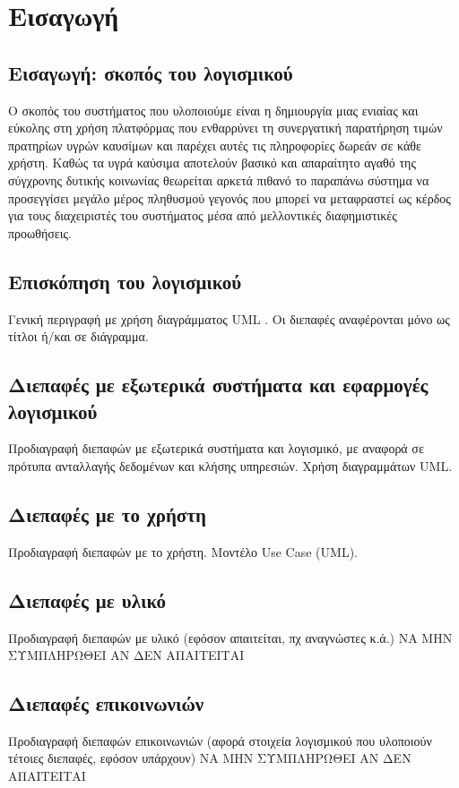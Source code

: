 \section{Εισαγωγή}

\subsection{Εισαγωγή: σκοπός του λογισμικού}
O σκοπός του συστήματος που υλοποιούμε είναι η δημιουργία μιας ενιαίας και εύκολης στη χρήση πλατφόρμας που ενθαρρύνει τη συνεργατική παρατήρηση τιμών πρατηρίων υγρών καυσίμων και παρέχει αυτές τις πληροφορίες δωρεάν σε κάθε χρήστη. Καθώς τα υγρά καύσιμα αποτελούν βασικό και απαραίτητο αγαθό της σύγχρονης δυτικής κοινωνίας θεωρείται αρκετά πιθανό το παραπάνω σύστημα να προσεγγίσει μεγάλο μέρος πληθυσμού γεγονός που μπορεί να μεταφραστεί ως κέρδος για τους διαχειριστές του συστήματος μέσα από μελλοντικές διαφημιστικές προωθήσεις.


\subsection{Επισκόπηση του λογισμικού}
Γενική περιγραφή με χρήση διαγράμματος UML . Οι διεπαφές αναφέρονται μόνο ως τίτλοι ή/και σε
διάγραμμα.


\subsection{Διεπαφές με εξωτερικά συστήματα και εφαρμογές λογισμικού}
Προδιαγραφή διεπαφών με εξωτερικά συστήματα και λογισμικό, με αναφορά σε πρότυπα ανταλλαγής
δεδομένων και κλήσης υπηρεσιών. Χρήση διαγραμμάτων UML.


\subsection{Διεπαφές με το χρήστη}
Προδιαγραφή διεπαφών με το χρήστη. Μοντέλο Use Case (UML).


\subsection{Διεπαφές με υλικό}
Προδιαγραφή διεπαφών με υλικό (εφόσον απαιτείται, πχ αναγνώστες κ.ά.)
ΝΑ ΜΗΝ ΣΥΜΠΛΗΡΩΘΕΙ ΑΝ ΔΕΝ ΑΠΑΙΤΕΙΤΑΙ

\subsection{Διεπαφές επικοινωνιών}
Προδιαγραφή διεπαφών επικοινωνιών (αφορά στοιχεία λογισμικού που υλοποιούν τέτοιες διεπαφές, εφόσον
υπάρχουν)
ΝΑ ΜΗΝ ΣΥΜΠΛΗΡΩΘΕΙ ΑΝ ΔΕΝ ΑΠΑΙΤΕΙΤΑΙ